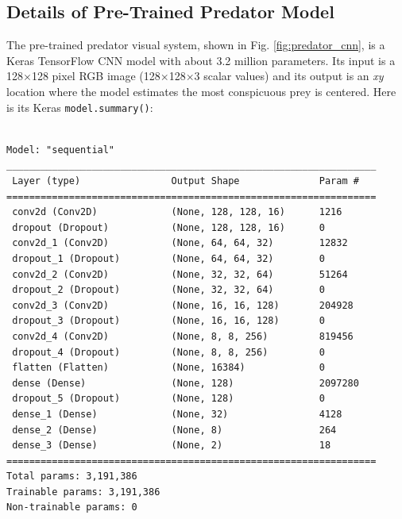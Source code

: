 \documentclass[letterpaper]{article}
\begin{document}
\subsection{Details of Pre-Trained Predator Model}
\label{sec:pretrained_predator_details}
\vspace{0.2cm}
\begin{minipage}{\linewidth}
The pre-trained predator visual system, shown in Fig. \ref{fig:predator_cnn}, is a Keras TensorFlow CNN model with about 3.2 million parameters. Its input is a 128$\times$128 pixel RGB image (128$\times$128$\times$3 scalar values) and its output is an \textit{xy} location where the model estimates the most conspicuous prey is centered. Here is its Keras \texttt{model.summary()}:
\par

\vspace{0.2cm}

\begin{minipage}{\linewidth-1.1cm}
\hspace*{1cm}
\begin{minipage}{\linewidth-1.1cm}
\begin{small}
\begin{verbatim}

Model: "sequential"
_________________________________________________________________
 Layer (type)                Output Shape              Param #
=================================================================
 conv2d (Conv2D)             (None, 128, 128, 16)      1216
 dropout (Dropout)           (None, 128, 128, 16)      0
 conv2d_1 (Conv2D)           (None, 64, 64, 32)        12832
 dropout_1 (Dropout)         (None, 64, 64, 32)        0
 conv2d_2 (Conv2D)           (None, 32, 32, 64)        51264
 dropout_2 (Dropout)         (None, 32, 32, 64)        0
 conv2d_3 (Conv2D)           (None, 16, 16, 128)       204928
 dropout_3 (Dropout)         (None, 16, 16, 128)       0
 conv2d_4 (Conv2D)           (None, 8, 8, 256)         819456
 dropout_4 (Dropout)         (None, 8, 8, 256)         0
 flatten (Flatten)           (None, 16384)             0
 dense (Dense)               (None, 128)               2097280
 dropout_5 (Dropout)         (None, 128)               0
 dense_1 (Dense)             (None, 32)                4128
 dense_2 (Dense)             (None, 8)                 264
 dense_3 (Dense)             (None, 2)                 18
=================================================================
Total params: 3,191,386
Trainable params: 3,191,386
Non-trainable params: 0
\end{verbatim}
\end{small}
\end{minipage}
\end{minipage}
\end{minipage}
\par
\end{document}
